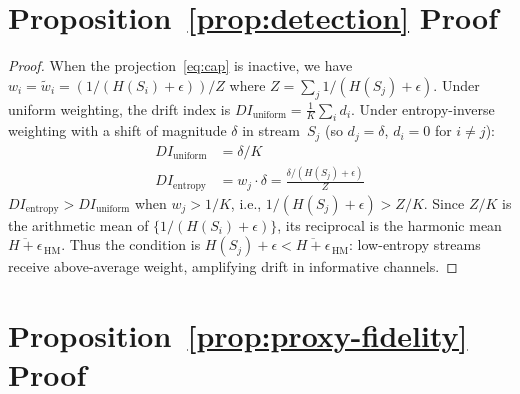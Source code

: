 \documentclass{article}
\begin{document}
\section{Proposition~\ref{prop:detection} Proof}
\label{sec:prop-proof}

\begin{proof}
When the projection~\eqref{eq:cap} is inactive, we have
$w_i = \tilde{w}_i = (1/(H(S_i)+\epsilon)) / Z$ where
$Z = \sum_j 1/(H(S_j)+\epsilon)$.
Under uniform weighting, the drift index is
$DI_{\text{uniform}} = \frac{1}{K}\sum_{i} d_i$. Under
entropy-inverse weighting with a shift of magnitude $\delta$ in
stream~$S_j$ (so $d_j = \delta$, $d_i = 0$ for $i \neq j$):
\begin{align}
DI_{\text{uniform}} &= \delta / K \\
DI_{\text{entropy}} &= w_j \cdot \delta
  = \frac{\delta / (H(S_j) + \epsilon)}{Z}
\end{align}
$DI_{\text{entropy}} > DI_{\text{uniform}}$ when
$w_j > 1/K$, i.e., $1/(H(S_j)+\epsilon) > Z/K$.
Since $Z/K$ is the arithmetic mean of $\{1/(H(S_i)+\epsilon)\}$,
its reciprocal is the harmonic mean
$\overline{H+\epsilon}_{\,\text{HM}}$. Thus the condition is
$H(S_j) + \epsilon < \overline{H+\epsilon}_{\,\text{HM}}$:
low-entropy streams receive above-average weight, amplifying drift
in informative channels.
\end{proof}


\section{Proposition~\ref{prop:proxy-fidelity} Proof}
\label{sec:proxy-fidelity-proof}
\end{document}
